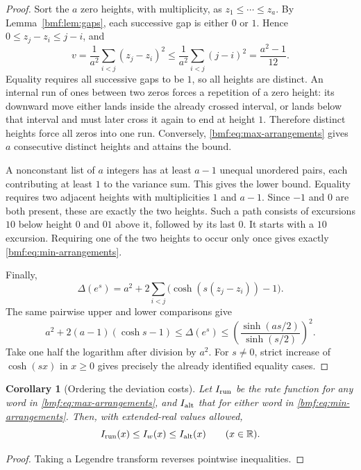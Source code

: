 \documentclass[11pt]{article}
\numberwithin{equation}{section}
\newtheorem{corollary}[theorem]{Corollary}
\theoremstyle{definition}
\theoremstyle{remark}
\newcommand{\R}{\mathbb{R}}
\begin{document}
\begin{proof}
Sort the $a$ zero heights, with multiplicity, as
$z_1\leq\cdots\leq z_a$. By Lemma~\ref{bmf:lem:gaps}, each
successive gap is either $0$ or $1$. Hence
$0\leq z_j-z_i\leq j-i$, and
\[
 v=\frac1{a^2}\sum_{i<j}(z_j-z_i)^2
 \leq\frac1{a^2}\sum_{i<j}(j-i)^2
 =\frac{a^2-1}{12}.
\]
Equality requires all successive gaps to be $1$, so all heights
are distinct. An internal run of ones between two zeros forces
a repetition of a zero height: its downward move either lands
inside the already crossed interval, or lands below that interval
and must later cross it again to end at height $1$.
Therefore distinct heights force all zeros into one run.
Conversely, \eqref{bmf:eq:max-arrangements} gives $a$ consecutive
distinct heights and attains the bound.

A nonconstant list of $a$ integers has at least $a-1$ unequal
unordered pairs, each contributing at least $1$ to the variance
sum. This gives the lower bound. Equality requires two adjacent
heights with multiplicities $1$ and $a-1$. Since $-1$ and $0$
are both present, these are exactly the two heights.
Such a path consists of excursions $10$ below height $0$ and
$01$ above it, followed by its last $0$. It starts with a $10$
excursion. Requiring one of the two heights to occur only once
gives exactly \eqref{bmf:eq:min-arrangements}.

Finally,
\begin{equation}\label{bmf:eq:cosh-pairs}
 \Delta(e^s)=a^2+
 2\sum_{i<j}\bigl(\cosh(s(z_j-z_i))-1\bigr).
\end{equation}
The same pairwise upper and lower comparisons give
\[
 a^2+2(a-1)(\cosh s-1)
 \leq\Delta(e^s)
 \leq\left(\frac{\sinh(as/2)}{\sinh(s/2)}\right)^2.
\]
Take one half the logarithm after division by $a^2$.
For $s\ne0$, strict increase of $\cosh(sx)$ in $x\geq0$
gives precisely the already identified equality cases.
\end{proof}

\begin{corollary}[Ordering the deviation costs]\label{bmf:cor:rate-order}
Let $I_{\rm run}$ be the rate function for any word in
\eqref{bmf:eq:max-arrangements}, and $I_{\rm alt}$ that for either
word in \eqref{bmf:eq:min-arrangements}. Then, with extended-real
values allowed,
\[
 I_{\rm run}(x)\leq I_w(x)\leq I_{\rm alt}(x)
 \qquad(x\in\R).
\]
\end{corollary}
\begin{proof}
Taking a Legendre transform reverses pointwise inequalities.
\end{proof}
\end{document}
